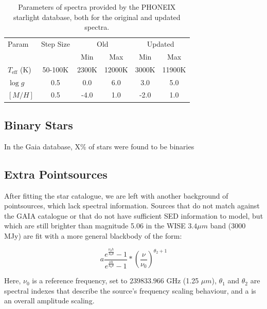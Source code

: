 \documentclass{aa}
\begin{document}
\begin{table}
    \centering
    \begin{tabular}{l c c c c c }
    \hline
    \hline
     Param & Step Size & \multicolumn{2}{c}{Old} & \multicolumn{2}{c}{Updated}\\ 
     & & Min & Max & Min & Max\\
    \hline
    \hline
    $T_{\mathrm{eff}}$ (K) & 50-100K & 2300K & 12000K & 3000K & 11900K\\
    $\log g$ & 0.5 & 0.0 & 6.0 & 3.0 & 5.0 \\
    $[M/H]$ & 0.5 & -4.0 & 1.0 & -2.0 & 1.0 \\
     \hline
    \end{tabular}
    \caption{Parameters of spectra provided by the PHONEIX starlight database, both for the original and updated spectra.}
    \label{tab:phoenix}
\end{table}

\subsection{Binary Stars}

In the Gaia database, X\% of stars were found to be binaries

\subsection{Extra Pointsources}

\label{sec:extragalacticmodel}

After fitting the star catalogue, we are left with another background of pointsources, which lack spectral information. Sources that do not match against the GAIA catalogue or that do not have sufficient SED information to model, but which are still brighter than magnitude 5.06 in the WISE $3.4 \mu m$ band ($3000$ MJy) are fit with a more general blackbody of the form:

\begin{equation}
a \frac{e^{\frac{\nu_0 h}{k_b \theta}} - 1}{e^{\frac{\nu h}{k_b \theta}} - 1} * (\frac{\nu}{\nu_0})^{\theta_2 + 1}
\end{equation}

Here, $\nu_0$ is a reference frequency, set to $239833.966$ GHz (1.25 $\mu m$), $\theta_1$ and $\theta_2$ are spectral indexes that describe the source's frequency scaling behaviour, and a is an overall amplitude scaling. 
\end{document}
